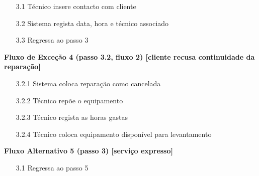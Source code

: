 \documentclass[../relatorio.tex]{subfiles}
\begin{document}
\begin{itemize}
\begin{flushleft}
          \end{flushleft}
          \begin{itemize}
              \item[3.1]{Técnico insere contacto com cliente}
              \item[3.2]{Sistema regista data, hora e técnico associado}
              \item[3.3]{Regressa ao passo 3}
          \end{itemize}
          \begin{flushleft}
              \textbf{Fluxo de Exceção 4 (passo 3.2, fluxo 2) [cliente recusa continuidade da reparação]}
          \end{flushleft}
          \begin{itemize}
              \item[3.2.1]{Sistema coloca reparação como cancelada}
              \item[3.2.2]{Técnico repõe o equipamento}
              \item[3.2.3]{Técnico regista as horas gastas}
              \item[3.2.4]{Técnico coloca equipamento disponível para levantamento}
          \end{itemize}
          \begin{flushleft}
              \textbf{Fluxo Alternativo 5 (passo 3) [serviço expresso]}
          \end{flushleft}
          \begin{itemize}
              \item[3.1]{Regressa ao passo 5}
          \end{itemize}
\end{itemize}
\end{document}
